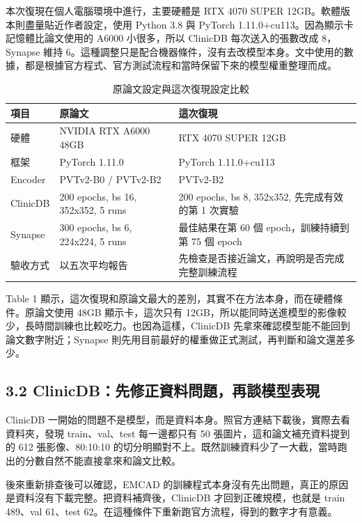 \documentclass[a4paper,12pt,twocolumn]{article}
\begin{document}
本次復現在個人電腦環境中進行，主要硬體是 RTX 4070 SUPER 12GB。軟體版本則盡量貼近作者設定，使用 Python 3.8 與 PyTorch 1.11.0+cu113。因為顯示卡記憶體比論文使用的 A6000 小很多，所以 ClinicDB 每次送入的張數改成 8，Synapse 維持 6。這種調整只是配合機器條件，沒有去改模型本身。文中使用的數據，都是根據官方程式、官方測試流程和當時保留下來的模型權重整理而成。

\begin{table}[t]
\centering
\caption{原論文設定與這次復現設定比較}
\scriptsize
\setlength{\tabcolsep}{5pt}
\renewcommand{\arraystretch}{1.18}
\begin{tabular}{l l l}
\toprule
\textbf{項目} & \textbf{原論文} & \textbf{這次復現} \\
\midrule
硬體 & NVIDIA RTX A6000 48GB & RTX 4070 SUPER 12GB \\
框架 & PyTorch 1.11.0 & PyTorch 1.11.0+cu113 \\
Encoder & PVTv2-B0 / PVTv2-B2 & PVTv2-B2 \\
ClinicDB & 200 epochs, bs 16, 352x352, 5 runs & 200 epochs, bs 8, 352x352, 先完成有效的第 1 次實驗 \\
Synapse & 300 epochs, bs 6, 224x224, 5 runs & 最佳結果在第 60 個 epoch，訓練持續到第 75 個 epoch \\
驗收方式 & 以五次平均報告 & 先檢查是否接近論文，再說明是否完成完整訓練流程 \\
\bottomrule
\end{tabular}
\end{table}

Table 1 顯示，這次復現和原論文最大的差別，其實不在方法本身，而在硬體條件。原論文使用 48GB 顯示卡，這次只有 12GB，所以能同時送進模型的影像較少，長時間訓練也比較吃力。也因為這樣，ClinicDB 先拿來確認模型能不能回到論文數字附近；Synapse 則先用目前最好的權重做正式測試，再判斷和論文還差多少。

\subsection*{3.2 ClinicDB：先修正資料問題，再談模型表現}
ClinicDB 一開始的問題不是模型，而是資料本身。照官方連結下載後，實際去看資料夾，發現 train、val、test 每一邊都只有 50 張圖片，這和論文補充資料提到的 612 張影像、80:10:10 的切分明顯對不上。既然訓練資料少了一大截，當時跑出的分數自然不能直接拿來和論文比較。

後來重新排查後可以確認，EMCAD 的訓練程式本身沒有先出問題，真正的原因是資料沒有下載完整。把資料補齊後，ClinicDB 才回到正確規模，也就是 train 489、val 61、test 62。在這種條件下重新跑官方流程，得到的數字才有意義。
\end{document}
